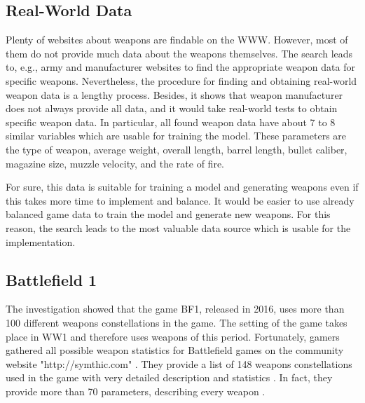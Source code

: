 \documentclass[MGS,Master,english]{twbook}%
\begin{document}
\subsection{Real-World Data}
Plenty of websites about weapons are findable on the \ac{WWW}. However, most of them do not provide much data about the weapons themselves. The search leads to, e.g., army and manufacturer websites to find the appropriate weapon data for specific weapons. Nevertheless, the procedure for finding and obtaining real-world weapon data is a lengthy process. Besides, it shows that weapon manufacturer does not always provide all data, and it would take real-world tests to obtain specific weapon data. In particular, all found weapon data have about 7 to 8 similar variables which are usable for training the model. These parameters are the type of weapon, average weight, overall length, barrel length, bullet caliber, magazine size, muzzle velocity, and the rate of fire.

For sure, this data is suitable for training a model and generating weapons even if this takes more time to implement and balance. It would be easier to use already balanced game data to train the model and generate new weapons. For this reason, the search leads to the most valuable data source which is usable for the implementation.

\subsection{Battlefield 1}\label{bf1::data}
The investigation showed that the game \ac{BF1}, released in 2016, uses more than 100 different weapons constellations in the game. The setting of the game takes place in \ac{WW1} and therefore uses weapons of this period. Fortunately, gamers gathered all possible weapon statistics for Battlefield games on the community website "http://symthic.com" \cite{symthic::bf1stats}. They provide a list of 148 weapons constellations used in the game with very detailed description and statistics \cite{symthic::bf1stats}. In fact, they provide more than 70 parameters, describing every weapon \cite{symthic::bf1stats}. 
\end{document}
